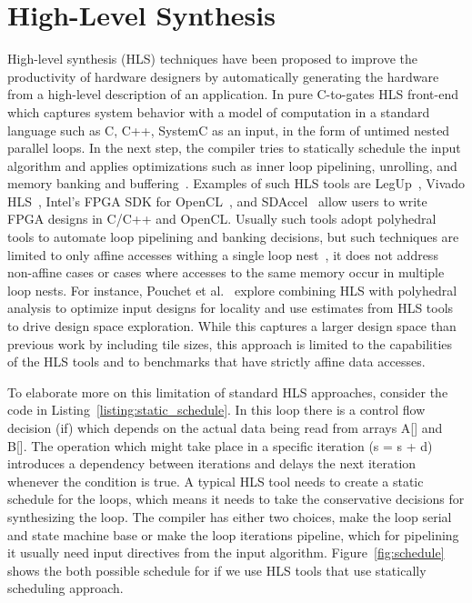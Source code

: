 \section{High-Level Synthesis}

High-level synthesis (HLS) techniques have been proposed to improve the productivity of hardware designers by automatically generating the hardware from a high-level description of an application.
In pure C-to-gates HLS front-end which captures system behavior with a model of computation in a standard language such as C, C++, SystemC as an input, in the form of untimed nested parallel loops.
In the next step, the compiler tries to statically schedule the input algorithm and applies optimizations such as inner loop pipelining, unrolling, and memory banking and buffering~\cite{chung_micro_2010, lee_1989_new, paulin_1989_force}.
Examples of such HLS tools are LegUp~\cite{canis_2011_legup}, Vivado HLS~\cite{vivadohls}, Intel’s FPGA SDK for OpenCL~\cite{opencl_sdk}, and SDAccel~\cite{sdaccel} allow users to write FPGA designs in C/C++ and OpenCL.
Usually such tools adopt polyhedral tools to automate loop pipelining and banking decisions, but such techniques are limited to only affine accesses withing a single loop nest~\cite{wang_2014_theory}, it does not address non-affine cases or cases where accesses to the same memory occur in multiple loop nests.
For instance, Pouchet et al.~\cite{pouchet_2013_polyhedral}  explore combining HLS with polyhedral analysis to optimize input designs for locality and use estimates from HLS tools to drive design space exploration.
While this captures a larger design space than previous work by including tile sizes, this approach is limited to the capabilities of the HLS tools and to benchmarks that have strictly affine data accesses.

To elaborate more on this limitation of standard HLS approaches, consider the code in Listing~\ref{listing:static_schedule}.
In this loop there is a control flow decision (if) which depends on the actual data being read from arrays A[] and B[].
The operation which might take place in a specific iteration (s = s + d) introduces a dependency between iterations and delays the next iteration whenever the condition is true.
A typical HLS tool needs to create a static schedule for the loops, which means it needs to take the conservative decisions for synthesizing the loop. The compiler has either two choices, make the loop serial and state machine base or make the loop iterations pipeline, which for pipelining it usually need input directives from the input algorithm.
Figure~\ref{fig:schedule} shows the both possible schedule for if we use HLS tools that use statically scheduling approach.


